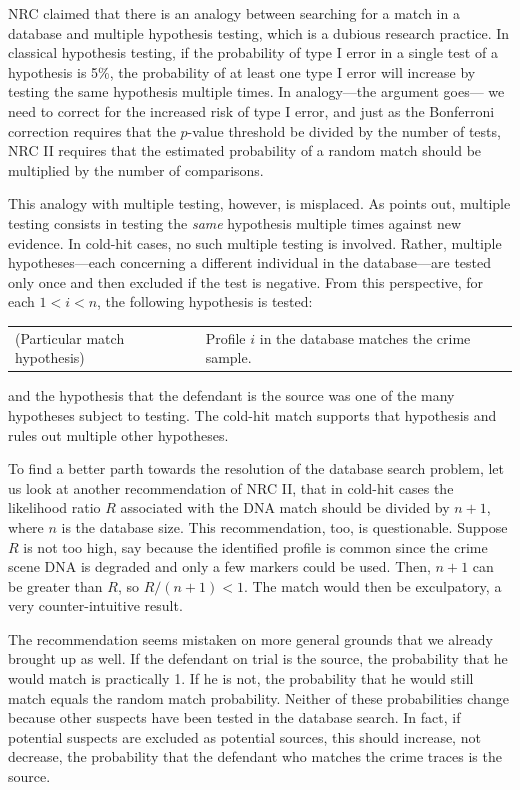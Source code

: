 \documentclass[10pt,dvipsnames,enabledeprecatedfontcommands]{scrartcl}
\begin{document}
NRC claimed that there is an analogy between searching for a match in a
database and multiple hypothesis testing, which is a dubious research
practice. In classical hypothesis testing, if the probability of type I
error in a single test of a hypothesis is 5\%, the probability of at
least one type I error will increase by testing the same hypothesis
multiple times. In analogy---the argument goes--- we need to correct for
the increased risk of type I error, and just as the Bonferroni
correction requires that the \(p\)-value threshold be divided by the
number of tests, NRC II requires that the estimated probability of a
random match should be multiplied by the number of comparisons.

This analogy with multiple testing, however, is misplaced. As
\citet{balding2002DNDatabaseSearch} points out, multiple testing
consists in testing the \textit{same} hypothesis multiple times against
new evidence. In cold-hit cases, no such multiple testing is involved.
Rather, multiple hypotheses---each concerning a different individual in
the database---are tested only once and then excluded if the test is
negative. From this perspective, for each \(1 < i <n\), the following
hypothesis is tested: \vspace{1mm}

\begin{tabular}{lp{8cm}}
(Particular match hypothesis) &
Profile $i$ in the database matches the crime sample.
\end{tabular}

\vspace{1mm} \noindent and the hypothesis that the defendant is the
source was one of the many hypotheses subject to testing. The cold-hit
match supports that hypothesis and rules out multiple other hypotheses.

To find a better parth towards the resolution of the database search
problem, let us look at another recommendation of NRC II, that in
cold-hit cases the likelihood ratio \(R\) associated with the DNA match
should be divided by \(n+1\), where \(n\) is the database size. This
recommendation, too, is questionable. Suppose \(R\) is not too high, say
because the identified profile is common since the crime scene DNA is
degraded and only a few markers could be used. Then, \(n+1\) can be
greater than \(R\), so \(R/(n+1)<1\). The match would then be
exculpatory, a very counter-intuitive result.

The recommendation seems mistaken on more general grounds that we
already brought up as well. If the defendant on trial is the source, the
probability that he would match is practically 1. If he is not, the
probability that he would still match equals the random match
probability. Neither of these probabilities change because other
suspects have been tested in the database search. In fact, if potential
suspects are excluded as potential sources, this should increase, not
decrease, the probability that the defendant who matches the crime
traces is the source.
\end{document}
